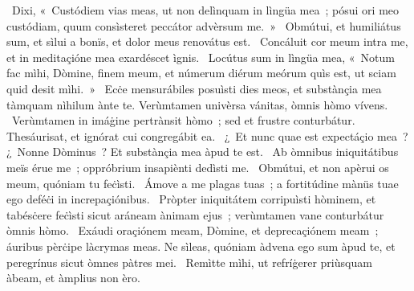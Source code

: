 ~Dixi, «~Custódiem vias meas, ut non delìnquam in lìngüa mea~; pósui ori meo custódiam, quum consìsteret peccátor advèrsum me.~»
~Obmútui, et humiliátus sum, et sìlui a bonïs, et dolor meus renovátus est. 
~Concáluit cor meum intra me, et in meditaçióne mea exardéscet ìgnis. 
~Locútus sum in lìngüa mea, «~Notum fac mìhi, Dòmine, finem meum, et númerum diérum meórum quìs est, ut sciam quid desit mìhi.~»
~Ecċe mensurábiles posuìsti dies meos, et substànçia mea tàmquam nìhilum ànte te. Verùmtamen univèrsa vánitas, òmnis hòmo vívens. 
~Verùmtamen in imáġine pertrànsit hòmo~; sed et frustre conturbátur. Thesáurisat, et ignórat cui congregábit ea. 
~¿~Et nunc quae est expectáçio mea~? ¿~Nonne Dòminus~? Et substànçia mea àpud te est. 
~Ab òmnibus iniquitátibus meïs érue me~; oppróbrium insapiènti dedìsti me. 
~Obmútui, et non apèrui os meum, quóniam tu feċìsti. 
~Ámove a me plagas tuas~; a fortitúdine mànüs tuae ego deféċi in increpaçiónibus. 
~Pròpter iniquitátem corripuìsti hòminem, et tabésċere feċìsti sicut aráneam ànimam ejus~; verùmtamen vane conturbátur òmnis hòmo. 
~Exáudi oraçiónem meam, Dòmine, et deprecaçiónem meam~; áuribus pèrċipe làcrymas meas. Ne sìleas, quóniam àdvena ego sum àpud te, et peregrínus sicut òmnes pàtres mei. 
~Remìtte mìhi, ut refríġerer priùsquam àbeam, et àmplius non èro. 
